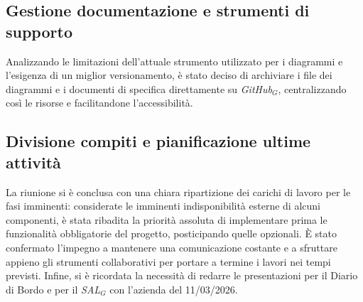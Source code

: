\documentclass[10pt, letterpaper]{article}
\begin{document}
\subsection*{Gestione documentazione e strumenti di supporto}
Analizzando le limitazioni dell'attuale strumento utilizzato per i diagrammi e l'esigenza di un miglior
versionamento, è stato deciso di archiviare i file dei diagrammi e i documenti di specifica direttamente su \textit{GitHub$_G$},
centralizzando così le risorse e facilitandone l'accessibilità.

\subsection*{Divisione compiti e pianificazione ultime attività}
La riunione si è conclusa con una chiara ripartizione dei carichi di lavoro per le fasi imminenti:
considerate le imminenti indisponibilità esterne di alcuni componenti, è stata ribadita la priorità assoluta di implementare prima le funzionalità obbligatorie del progetto, posticipando quelle opzionali.
È stato confermato l'impegno a mantenere una comunicazione costante e a sfruttare appieno gli strumenti collaborativi per portare a termine i lavori nei tempi previsti.
Infine, si è ricordata la necessità di redarre le presentazioni per il Diario di Bordo e per il \textit{SAL$_G$} con l'azienda del 11/03/2026.

\makeDecisionTable
\end{document}
